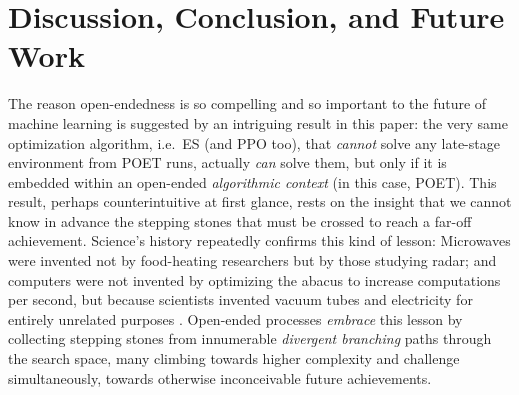 \documentclass{article}
\newcommand{\removed}[1]{\comments{\textcolor{gray}{\sout{#1}}}}
\newcommand{\comments}[1]{#1} %
\begin{document}
\section{Discussion, Conclusion, and Future Work}
\label{conclusion}
The reason open-endedness is so compelling and so important to the future of machine learning is suggested by an intriguing result in this paper: the very same optimization algorithm, i.e.\ ES (and PPO too),  that \emph{cannot} solve any late-stage environment from POET runs, actually \emph{can} solve them, but only if it is embedded within an open-ended \emph{algorithmic context} (in this case, POET). This result, perhaps counterintuitive at first glance, 
rests on the insight that we cannot know in advance the stepping stones that must be crossed to reach a far-off achievement. 
Science's history  repeatedly confirms this kind of lesson: Microwaves were invented not by food-heating researchers but by those studying radar; and computers were not invented by optimizing the abacus to increase computations per second, but because scientists invented vacuum tubes and electricity for entirely unrelated purposes \cite{stanley:book15}. Open-ended processes \emph{embrace} this lesson by collecting stepping stones from innumerable \emph{divergent branching} paths through the search space, many climbing towards higher complexity and challenge simultaneously, towards otherwise inconceivable future achievements.
\end{document}
